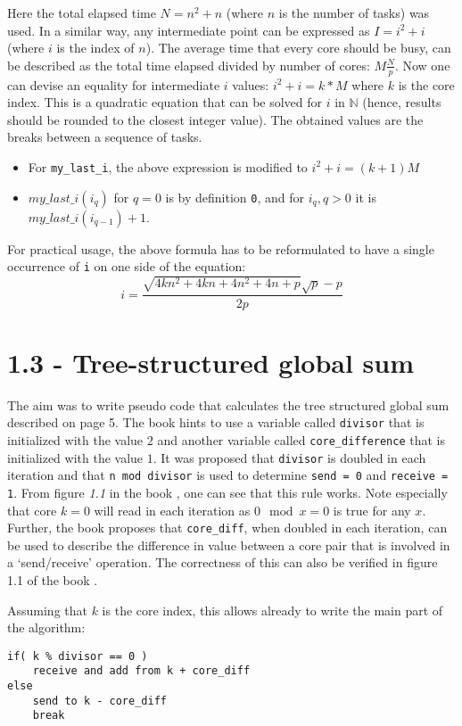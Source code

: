 \documentclass[a4paper,11pt,twoside]{article}
\begin{document}
Here the total elapsed time $N = n^{2} + n$ (where $n$ is the number of tasks) was used. In a similar way, any intermediate point can be expressed as $I = i^{2} + i$ (where $i$ is the index of $n$). The average time that every core should be busy, can be described as the total time elapsed divided by number of cores: $M\frac{N}{p}$. Now one can devise an equality for intermediate $i$ values: $i^{2}+i = k*M$ where $k$ is the core index. This is a quadratic equation that can be solved for $i$ in $\mathbb{N}$ (hence, results should be rounded to the closest integer value). The obtained values are the breaks between a sequence of tasks. 
\begin{itemize}
\item For \verb+my_last_i+, the above expression is modified to  $i^{2}+i=(k + 1)M$
\item $my\_last\_i(i_{q})$ for $q=0$ is by definition \verb+0+, and for $i_{q}, q > 0$ it is $my\_last\_i(i_{q-1}) + 1$. 
\end{itemize}
 
For practical usage, the above formula has to be reformulated to have a single occurrence of \verb+i+ on one side of the equation:
\begin{equation*}
i=\frac{\sqrt{4kn^{2}+4kn+4n^{2}+4n+p}\sqrt{p}-p}{2p}
\end{equation*}

\section{1.3 - Tree-structured global sum}
The aim was to write pseudo code that calculates the tree structured global sum described on page 5. The book hints to use a variable called \verb+divisor+ that is initialized with the value $2$ and another variable called \verb+core_difference+ that is initialized with the value $1$. It was proposed that \verb+divisor+ is doubled in each iteration and that \verb+n mod divisor+ is used to determine \verb+send = 0+ and \verb+receive = 1+. From figure \textit{1.1} in the book \cite[p.5]{pacheco2011}, one can see that this rule works. Note especially that core $k = 0$ will read in each iteration as $0 \mod x = 0$ is true for any $x$. Further, the book proposes that \verb+core_diff+, when doubled in each iteration, can be used to describe the difference in value between a core pair that is involved in a `send/receive' operation. The correctness of this can also be verified in figure 1.1 of the book \cite[p.5]{pacheco2011}.

Assuming that $k$ is the core index, this allows already to write the main part of the algorithm:
\begin{verbatim}
if( k % divisor == 0 )
    receive and add from k + core_diff
else
    send to k - core_diff
    break
\end{verbatim}
\end{document}
